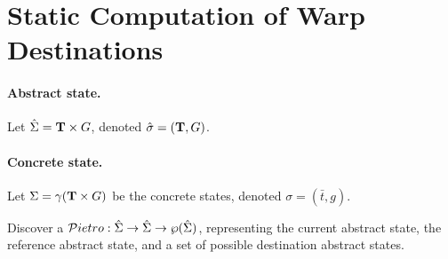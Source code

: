 

\section{Static Computation of Warp Destinations}

\paragraph{Abstract state.}
Let $\hat{\Sigma} = \mathbf{T} \times G$, denoted $\hat{\sigma} = (\mathbf{T},G)$.

\newcommand\ts{\bar{t}}

\paragraph{Concrete state.}
Let $\Sigma = \gamma(\mathbf{T} \times G)$ be the concrete states, denoted $\sigma = (\ts,g)$.

\newcommand\Pietrot{{\cal P}ietro}

Discover a $\Pietrot : \hat{\Sigma} \rightarrow \hat{\Sigma}
\rightarrow \wp({\hat{\Sigma}})$, representing the current abstract
state, the reference abstract state, and a set of possible destination
abstract states.


